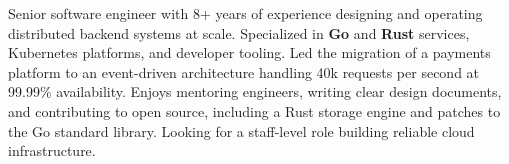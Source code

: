 


\begin{justify}
Senior software engineer with 8+ years of experience designing and operating distributed backend systems at scale. Specialized in \textbf{Go} and \textbf{Rust} services, Kubernetes platforms, and developer tooling. Led the migration of a payments platform to an event-driven architecture handling 40k requests per second at 99.99\% availability. Enjoys mentoring engineers, writing clear design documents, and contributing to open source, including a Rust storage engine and patches to the Go standard library. Looking for a staff-level role building reliable cloud infrastructure.
\end{justify}



